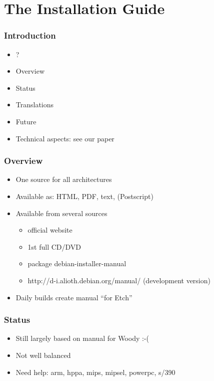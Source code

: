 \documentclass{beamer}
\begin{document}

\section{The Installation Guide}

\begin{frame}
  \frametitle{Introduction}
	\begin{itemize}
	\item
		?
	\item
		Overview
	\item
		Status
	\item
		Translations
	\item
		Future
	\item
		Technical aspects: see our paper
	\end{itemize}
\end{frame}

\begin{frame}
  \frametitle{Overview}
	\begin{itemize}
	\item<1->
		One source for all architectures
	\item<2->
		Available as: HTML, PDF, text, (Postscript)
	\item<3->
		Available from several sources
		\begin{itemize}
		\item<3->
			official website
		\item<3->
			1st full CD/DVD
		\item<3->
			package debian-installer-manual
		\item<3->
			http://d-i.alioth.debian.org/manual/ (development version)
		\end{itemize}
	\item<4->
		Daily builds create manual ``for Etch''
	\end{itemize}
\end{frame}

\begin{frame}
  \frametitle{Status}
	\begin{itemize}
	\item
		Still largely based on manual for Woody :-(
	\item
		Not well balanced
	\item
		Need help: arm, hppa, mips, mipsel, powerpc, s/390
	\end{itemize}
\end{frame}
\end{document}
